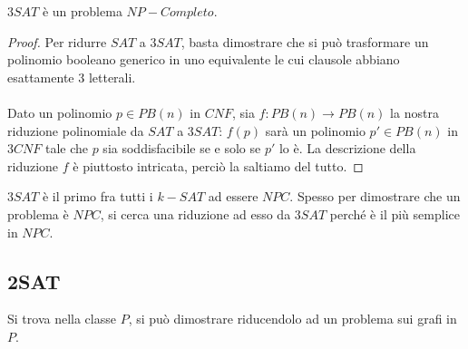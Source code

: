 \begin{lemm}
	$3SAT$ è un problema $NP-Completo$.
\end{lemm}

\begin{proof}
	Per ridurre $SAT$ a $3SAT$, basta dimostrare che si può trasformare un polinomio booleano generico in uno equivalente le cui clausole abbiano esattamente 3 letterali. \\ \\
	Dato un polinomio $p \in PB(n)$ in $CNF$, sia $f : PB(n) \rightarrow PB(n)$ la nostra riduzione polinomiale da $SAT$ a $3SAT$: $f(p)$ sarà un polinomio $p' \in PB(n)$ in $3CNF$ tale che $p$ sia soddisfacibile se e solo se $p'$ lo è.  La descrizione della riduzione $f$ è piuttosto intricata, perciò la saltiamo del tutto.
\end{proof}

\begin{remark}
	$3SAT$ è il primo fra tutti i $k-SAT$ ad essere $NPC$. Spesso per dimostrare che un problema è $NPC$, si cerca una riduzione ad esso da $3SAT$ perché è il più semplice in $NPC$.
\end{remark}

\subsection{2SAT}

Si trova nella classe $P$, si può dimostrare riducendolo ad un problema sui grafi in $P$.
